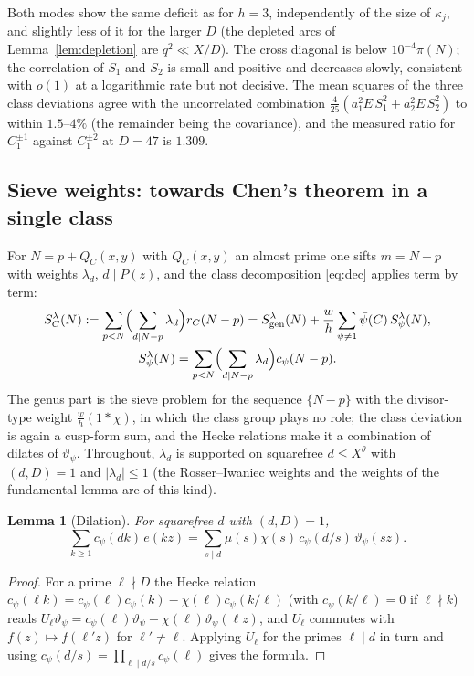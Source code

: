 ﻿\documentclass[11pt]{amsart}
\newtheorem{lemma}[theorem]{Lemma}
\theoremstyle{remark}
\newcommand{\vt}{\vartheta}
\newcommand{\gen}{\mathrm{gen}}
\begin{document}
Both modes show the same deficit as for $h=3$, independently of the size of $\kappa_j$, and slightly less of it for the larger $D$ (the depleted arcs of Lemma~\ref{lem:depletion} are $q^2\ll X/D$). The cross diagonal is below $10^{-4}\pi(N)$; the correlation of $S_1$ and $S_2$ is small and positive and decreases slowly, consistent with $o(1)$ at a logarithmic rate but not decisive. The mean squares of the three class deviations agree with the uncorrelated combination $\frac4{25}(a_1^2E\,S_1^2+a_2^2E\,S_2^2)$ to within $1.5$--$4\%$ (the remainder being the covariance), and the measured ratio for $C_1^{\pm1}$ against $C_1^{\pm2}$ at $D=47$ is $1.309$.

\subsection{Sieve weights: towards Chen's theorem in a single class}\label{subsec:sieve}
For $N=p+Q_C(x,y)$ with $Q_C(x,y)$ an almost prime one sifts $m=N-p$ with weights $\lambda_d$, $d\mid P(z)$, and the class decomposition \eqref{eq:dec} applies term by term:
\begin{gather*}
S^\lambda_C(N):=\sum_{p<N}\Bigl(\sum_{d\mid N-p}\lambda_d\Bigr)r_C(N-p)=S^\lambda_\gen(N)+\frac wh\sum_{\psi\ne1}\bar\psi(C)\,S^\lambda_\psi(N),\\
S^\lambda_\psi(N)=\sum_{p<N}\Bigl(\sum_{d\mid N-p}\lambda_d\Bigr)c_\psi(N-p).
\end{gather*}
The genus part is the sieve problem for the sequence $\{N-p\}$ with the divisor-type weight $\frac wh(1*\chi)$, in which the class group plays no role; the class deviation is again a cusp-form sum, and the Hecke relations make it a combination of dilates of $\vt_\psi$. Throughout, $\lambda_d$ is supported on squarefree $d\le X^\theta$ with $(d,D)=1$ and $|\lambda_d|\le1$ (the Rosser--Iwaniec weights and the weights of the fundamental lemma are of this kind).

\begin{lemma}[Dilation]\label{lem:dilation}
For squarefree $d$ with $(d,D)=1$,
\[
\sum_{k\ge1}c_\psi(dk)\,e(kz)=\sum_{s\mid d}\mu(s)\chi(s)\,c_\psi(d/s)\,\vt_\psi(sz).
\]
\end{lemma}
\begin{proof}
For a prime $\ell\nmid D$ the Hecke relation $c_\psi(\ell k)=c_\psi(\ell)c_\psi(k)-\chi(\ell)c_\psi(k/\ell)$ (with $c_\psi(k/\ell)=0$ if $\ell\nmid k$) reads $U_\ell\vt_\psi=c_\psi(\ell)\vt_\psi-\chi(\ell)\vt_\psi(\ell z)$, and $U_\ell$ commutes with $f(z)\mapsto f(\ell'z)$ for $\ell'\ne\ell$. Applying $U_\ell$ for the primes $\ell\mid d$ in turn and using $c_\psi(d/s)=\prod_{\ell\mid d/s}c_\psi(\ell)$ gives the formula.
\end{proof}
\end{document}
